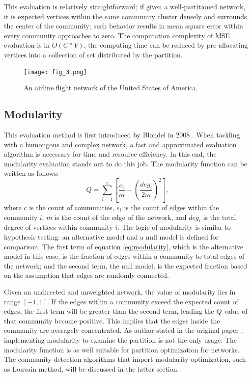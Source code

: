 \documentclass[12pt]{article}
\begin{document}
\bigbreak

This evaluation is relatively straightforward; if given a well-partitioned network, it is expected vertices within the same community cluster densely and surrounds the center of the community; such behavior results in mean square error within every community approaches to zero. The computation complexity of MSE evaluation is in $O(C*V)$, the computing time can be reduced by pre-allocating vertices into a collection of set distributed by the partition.

\begin{figure}
\centering
\texttt{[image: fig\_3.png]}

\caption{\label{fig:fig_3}An airline flight network of the United States of America\cite{11}.}
\end{figure}

\subsection{Modularity}

This evaluation method is first introduced by Blondel in 2008 \cite{12}. When tackling with a humongous and complex network, a fast and approximated evaluation algorithm is necessary for time and resource efficiency. In this end, the modularity evaluation stands out to do this job. The modularity function \cite{13} can be written as follows:
\begin{equation}\label{eq:modularity}
Q = \sum_{i=1}^c \left[  \frac{e_i}{m} - \left( \frac{deg_i}{2m} \right)^2  \right],
\end{equation}
where $c$ is the count of communities, $e_i$ is the count of edges within the community $i$, $m$ is the count of the edge of the network, and $deg_i$ is the total degree of vertices within community $i$. The logic of modularity is similar to hypothesis testing: an alternative model and a null model is defined for comparison. The first term of equation \eqref{eq:modularity}, which is the alternative model in this case, is the fraction of edges within a community to total edges of the network; and the second term, the null model, is the expected fraction based on the assumption that edges are randomly connected.

\bigbreak

Given an undirected and unweighted network, the value of modularity lies in range $[-1, 1]$. If the edges within a community exceed the expected count of edges, the first term will be greater than the second term, leading the $Q$ value of that community become positive. This implies that the edges inside the community are averagely concentrated. As author stated in the original paper \cite{12}, implementing modularity to examine the partition is not the only usage. The modularity function is as well suitable for partition optimization for  networks. The community detection algorithms that import modularity optimization, such as Louvain method, will be discussed in the latter section.
\end{document}
